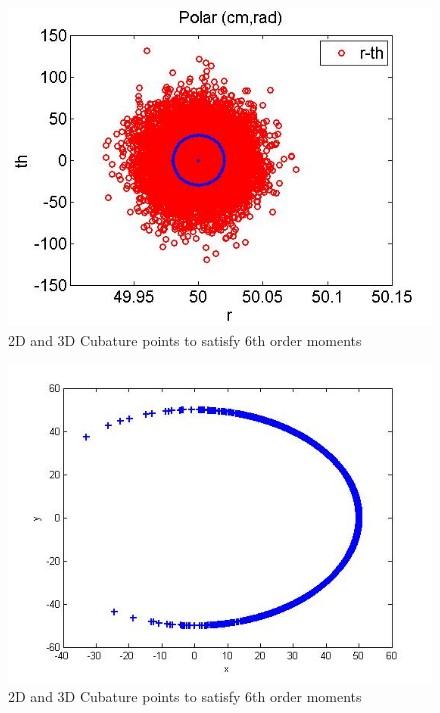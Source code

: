 \documentclass[11pt]{beamer}
\begin{document}
\begin{frame}
   \begin{figure}[thpb]
      \centering
      \includegraphics[width=1\textwidth]{polar}
      \caption{2D and 3D Cubature points to satisfy 6th order moments}
      \label{fig:23d4m1}
   \end{figure} 
\end{frame}
\begin{frame}
   \begin{figure}[thpb]
      \centering
      \includegraphics[width=1\textwidth]{polartocart2}
      \caption{2D and 3D Cubature points to satisfy 6th order moments}
      \label{fig:23d4m1}
   \end{figure} 
\end{frame}
\end{document}
